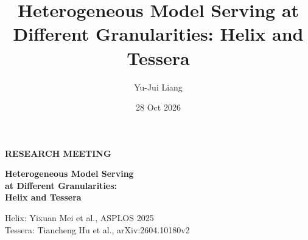 \documentclass[aspectratio=169,10pt]{beamer}
\title{Heterogeneous Model Serving at Different Granularities: Helix and Tessera}
\author{Yu-Jui Liang}
\date{28 Oct 2026}
\newcommand{\smalllabel}[1]{{\scriptsize\bfseries\color{Accent}\MakeUppercase{#1}}}
\begin{document}
\begin{frame}[plain]

\vspace{.48cm}
\smalllabel{Research meeting}\par\vspace{.32cm}
{\LARGE\bfseries Heterogeneous Model Serving\\[.14cm]at Different Granularities:\\[.14cm]Helix and Tessera\par}
\vspace{.10cm}{\large Advisor: Hsiang-Yun Cheng\par}
\vspace{.08cm}{\large National Taiwan University \quad | \quad Academia Sinica\par}
\vspace{.08cm}{\large 28 Oct 2026\par}
\vfill
{\footnotesize\color{Muted}Helix: Yixuan Mei et al., ASPLOS 2025\\
Tessera: Tiancheng Hu et al., arXiv:2604.10180v2}\par
\vspace{.08cm}{\color{Accent}\rule{\textwidth}{.7pt}}

\end{frame}
\end{document}
